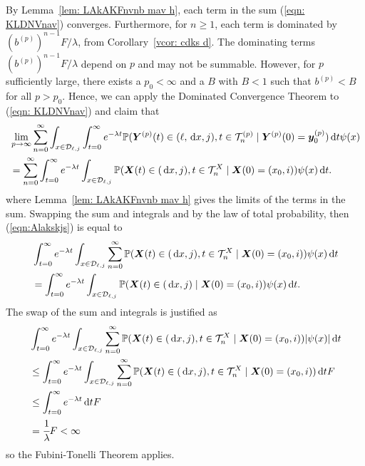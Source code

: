 By Lemma~\ref{lem: LAkAKFnvnb mav h}, each term in the sum (\ref{eqn: KLDNVnav}) converges. Furthermore, for \(n\geq 1\), each term is dominated by \(\left(b^{(p)}\right)^{n-1}F/\lambda\), from Corollary~\ref{vcor: cdks d}. The dominating terms \(\left(b^{(p)}\right)^{n-1}F/\lambda\) depend on \(p\) and may not be summable. However, for \(p\) sufficiently large, there exists a \(p_0<\infty\) and a \(B\) with \(B<1\) such that \(b^{(p)}<B\) for all \(p>p_0\). Hence, we can apply the Dominated Convergence Theorem to (\ref{eqn: KLDNVnav}) and claim that  
\begin{align}
	&\lim_{p\to\infty} \sum_{n=0}^\infty\int_{x\in\mathcal D_{\ell,j}}\int_{t=0}^\infty e^{-\lambda t} \mathbb P( {\boldsymbol Y}^{(p)}(t) \in (\ell, \, \mathrm{d} x, j), t\in\mathcal T_n^{(p)} \mid \nonumber 
	\boldsymbol Y^{(p)}(0)=\boldsymbol y_0^{(p)})\, \mathrm{d} t \psi(x)  \nonumber
	\\&= \sum_{n=0}^\infty\int_{t=0}^\infty e^{-\lambda t}  \int_{x\in\mathcal{D}_{\ell,j}}\mathbb P(\boldsymbol X(t)\in(\, \mathrm{d} x, j), t\in\mathcal T_n^X 
	\mid \boldsymbol X(0)=(x_0,i)) 
	\psi(x)\, \mathrm{d} t. \label{eqn:Alakskjs}
\end{align}
where Lemma~\ref{lem: LAkAKFnvnb mav h} gives the limits of the terms in the sum. Swapping the sum and integrals and by the law of total probability, then (\ref{eqn:Alakskjs}) is equal to 
\begin{align}
	& \int_{t=0}^\infty e^{-\lambda t}  \int_{x\in\mathcal{D}_{\ell,j}}\sum_{n=0}^\infty\mathbb P(\boldsymbol X(t)\in(\, \mathrm{d} x, j), t\in\mathcal T_n^X 
	\mid \boldsymbol X(0)=(x_0, i))\psi(x)\, \mathrm{d} t \nonumber
	\\&= \int_{t=0}^\infty e^{-\lambda t}  \int_{x\in\mathcal{D}_{\ell,j}} \mathbb P(\boldsymbol X(t)\in(\, \mathrm{d} x, j)  
	\mid \boldsymbol X(0)=(x_0, i))\psi(x)\, \mathrm{d} t. \nonumber
\end{align}
The swap of the sum and integrals is justified as 
\begin{align}
	& \int_{t=0}^\infty e^{-\lambda t}  \int_{x\in\mathcal{D}_{\ell,j}}\sum_{n=0}^\infty\mathbb P(\boldsymbol X(t)\in(\, \mathrm{d} x, j), t\in\mathcal T_n^X 
	\mid \boldsymbol X(0)=(x_0, i))|\psi(x)|\, \mathrm{d} t \nonumber
	\\&\leq\int_{t=0}^\infty e^{-\lambda t}  \int_{x\in\mathcal{D}_{\ell,j}}\sum_{n=0}^\infty\mathbb P(\boldsymbol X(t)\in(\, \mathrm{d} x, j), t\in\mathcal T_n^X 
	\mid \boldsymbol X(0)=(x_0, i))\, \mathrm{d} t  F\nonumber
	\\&\leq\int_{t=0}^\infty e^{-\lambda t} \, \mathrm{d} t  F\nonumber
	\\&=\cfrac{1}{\lambda}F<\infty
\end{align}
so the Fubini-Tonelli Theorem applies. 

